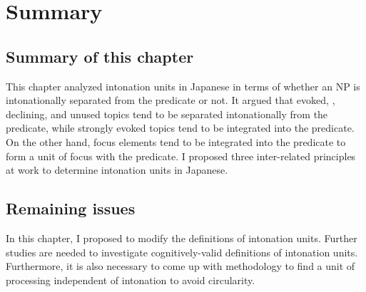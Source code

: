 \section{Summary}

\subsection{Summary of this chapter}


This chapter analyzed intonation units in Japanese
in terms of whether an NP is intonationally separated from the predicate or not.
It argued that evoked, , declining, and unused topics tend to be separated intonationally from the predicate,
while strongly evoked topics tend to be integrated into the predicate.
On the other hand,
focus elements tend to be integrated into the predicate
to form a unit of focus with the predicate.
I proposed three inter-related principles at work to determine
intonation units in Japanese.



\subsection{Remaining issues}

In this chapter,
I proposed to modify the definitions of intonation units.
Further studies are needed to investigate cognitively-valid definitions of intonation units.
Furthermore, it is also necessary to come up with methodology to find a unit of processing independent of intonation
to avoid circularity.






